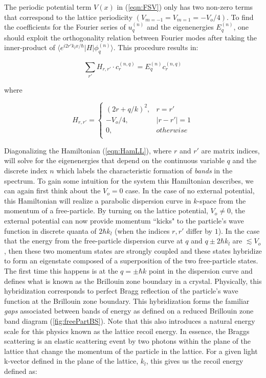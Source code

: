 The periodic potential term $V(x)$ in (\ref{eqn:FSV}) only has two non-zero terms that correspond to the lattice periodicity $ \left ( V_{m=-1} = V_{m=1} = -V_o / 4 \right ) $. To find the coefficients for the Fourier series of $u_q^{(n)}$ and the eigenenergies $E_q^{(n)}$, one should exploit the orthogonality relation between Fourier modes after taking the inner-product of $\langle e^{i 2 r' k_l x/\hbar} | H | \phi_q^{(n)} \rangle$. This procedure results in:

\begin{equation}
\label{eqn:HamC}
\sum_{r'} H_{r,r'} \cdot c_r^{(n,q)} = E_q^{(n)} c_r^{(n,q)}
\end{equation}

where

\begin{equation}
\label{eqn:HamLL}
H_{r,r'} = \left \{
\begin{array}{ll}
   (2 r + q / k)^2 ,& r=r' \\
   -V_o/4, & | r-r' | = 1 \\
   0, & otherwise \\
\end{array} 
\right .
\end{equation}

Diagonalizing the Hamiltonian (\ref{eqn:HamLL}), where $r$ and $r'$ are matrix indices, will solve for the eigenenergies that depend on the continuous variable $q$ and the discrete index $n$ which labels the characteristic formation of \emph{bands} in the spectrum. To gain some intuition for the system this Hamiltonian describes, we can again first think about the $V_o=0$ case. In the case of no external potential, this Hamiltonian will realize a parabolic dispersion curve in $k$-space from the momentum of a free-particle. By turning on the lattice potential, $V_o \neq 0 $, the external potential can now provide momentum ``kicks" to the particle's wave function in discrete quanta of $2\hbar k_l$ (when the indices $r,r'$ differ by $1$). In the case that the energy from the free-particle dispersion curve at $q$ and $q\pm 2\hbar k_l$ are $\lesssim V_o$, then these two momentum states are strongly coupled and these states hybridize to form an eigenstate composed of a superposition of the two free-particle states. The first time this happens is at the $q=\pm \hbar k$ point in the dispersion curve and defines what is known as the Brillouin zone boundary in a crystal. Physically, this hybridization corresponds to perfect Bragg reflection of the particle's wave function at the Brillouin zone boundary. This hybridization forms the familiar \emph{gaps} associated between bands of energy as defined on a reduced Brillouin zone band diagram (\ref{fig:freePartBS}). Note that this also introduces a natural energy scale for this physics known as the lattice recoil energy. In essence, the Braggs scattering is an elastic scattering event by two photons within the plane of the lattice that change the momentum of the particle in the lattice. For a given light k-vector defined in the plane of the lattice, $k_l$, this gives us the recoil energy defined as:

